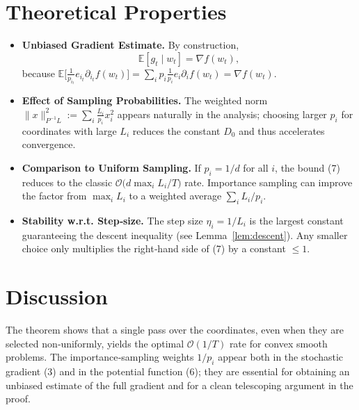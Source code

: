 \documentclass[11pt]{article}
\newcommand{\E}{\mathbb{E}}
\begin{document}
\section*{Theoretical Properties}
\begin{itemize}
    \item \textbf{Unbiased Gradient Estimate.} By construction,
    \[
        \E\!\left[g_{t}\mid w_{t}\right]=\nabla f(w_{t}),
    \tag{8}
    \]
    because \(\E\big[\frac{1}{p_{i_{t}}}e_{i_{t}}\partial_{i_{t}}f(w_{t})\big]=\sum_{i}p_{i}\frac{1}{p_{i}}e_{i}\partial_{i}f(w_{t})=\nabla f(w_{t})\).
    \item \textbf{Effect of Sampling Probabilities.} The weighted norm \(\|x\|_{P^{-1}L}^{2}:=\sum_{i}\frac{L_{i}}{p_{i}}x_{i}^{2}\) appears naturally in the analysis; choosing larger \(p_{i}\) for coordinates with large \(L_{i}\) reduces the constant \(D_{0}\) and thus accelerates convergence.
    \item \textbf{Comparison to Uniform Sampling.} If \(p_{i}=1/d\) for all \(i\), the bound (7) reduces to the classic \(\mathcal{O}\big(d\max_{i}L_{i}/T\big)\) rate. Importance sampling can improve the factor from \(\max_{i}L_{i}\) to a weighted average \(\sum_{i}L_{i}/p_{i}\).
    \item \textbf{Stability w.r.t. Step‑size.} The step size \(\eta_{i}=1/L_{i}\) is the largest constant guaranteeing the descent inequality (see Lemma~\ref{lem:descent}). Any smaller choice only multiplies the right‑hand side of (7) by a constant \(\le1\).
\end{itemize}

\section*{Discussion}
The theorem shows that a single pass over the coordinates, even when they are selected non‑uniformly, yields the optimal \(\mathcal{O}(1/T)\) rate for convex smooth problems. The importance‑sampling weights \(1/p_{i}\) appear both in the stochastic gradient (3) and in the potential function (6); they are essential for obtaining an unbiased estimate of the full gradient and for a clean telescoping argument in the proof.

\newpage
\end{document}
